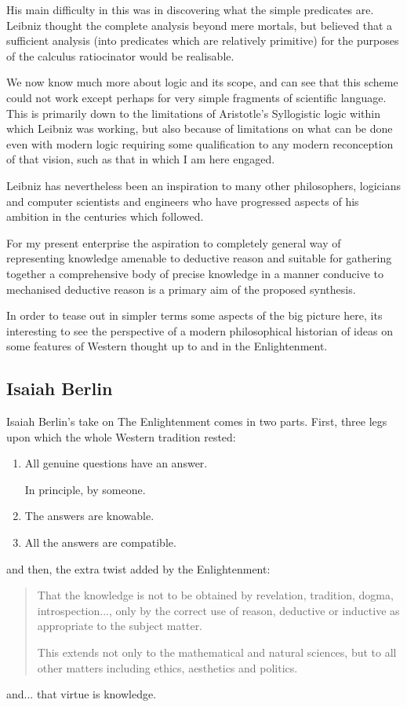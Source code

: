 \documentclass[10pt,titlepage]{book}
\begin{document}
His main difficulty in this was in discovering what the simple predicates are. Leibniz thought the complete analysis beyond mere mortals, but believed that a sufficient analysis (into predicates which are relatively primitive) for the purposes of the calculus ratiocinator would be realisable.

We now know much more about logic and its scope, and can see that this scheme could not work except perhaps for very simple fragments of scientific language.
This is primarily down to the limitations of Aristotle's Syllogistic logic within which Leibniz was working, but also because of limitations on what can be done even with modern logic requiring some qualification to any modern reconception of that vision, such as that in which I am here engaged.

Leibniz has nevertheless been an inspiration to many other philosophers, logicians and computer scientists and engineers who have progressed aspects of his ambition in the centuries which followed.

For my present enterprise the aspiration to completely general way of representing knowledge amenable to deductive reason and suitable for gathering together a comprehensive body of precise knowledge in a manner conducive to mechanised deductive reason is a primary aim of the proposed synthesis.

In order to tease out in simpler terms some aspects of the big picture here, its interesting to see the perspective of a modern philosophical historian of ideas on some features of Western thought up to and in the Enlightenment.

\subsection{Isaiah Berlin}

Isaiah Berlin's take on The Enlightenment\cite{berlinRR} comes in two parts.
First, three legs upon which the whole Western tradition rested:
\begin{enumerate}
  \item All genuine questions have an answer.

    In principle, by someone.
\item  The answers are knowable.
\item All the answers are compatible.
\end{enumerate}

and then, the extra twist added by the Enlightenment:
\begin{quotation}
That the knowledge is not to be obtained by revelation, tradition, dogma, introspection..., only by the correct use of reason, deductive or inductive as appropriate to the subject matter.

This extends not only to the mathematical and natural sciences, but to all other matters including ethics, aesthetics and politics.
\end{quotation}
and... that virtue is knowledge.
\end{document}
